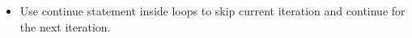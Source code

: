 \setlength{\columnsep}{3pt}
\begin{flushleft}

	\begin{itemize}
		\item Use continue statement inside loops to skip current iteration and continue for the next iteration.
		
		\bigskip
		
	\end{itemize}

\end{flushleft}
\newpage

